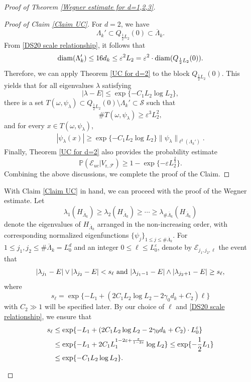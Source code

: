 \documentclass[11pt,reqno,UTF8,twoside]{amsart}
\newcommand{\barLambda}{\overline{\Lambda}}
\renewcommand{\P}{\mathbb{P}}
\newcommand{\mcE}{\mathcal{E}}
\newcommand{\mcF}{\mathcal{F}}
\newcommand{\mcS}{\mathcal{S}}
\newcommand{\diam}{{\rm diam}}
\theoremstyle{definition}
\numberwithin{equation}{section}
\begin{document}
\begin{proof}[Proof of Theorem \ref{Wegner estimate for d=1,2,3}]
\begin{proof}[Proof of Claim \ref{Claim UC}]
For $d=2$, we have%
\[\Lambda_k'\subset Q_{\frac12 L_2}(0) \subset \barLambda_k.\]
From  \eqref{DS20 scale relationship}, it follows that
\[\diam(\Lambda_k')\leq 16d_k \leq \varepsilon^2 L_2=\varepsilon^2 \cdot \diam(Q_{\frac{1}{2} L_2}(0)).\]
Therefore, we can  apply Theorem \ref{UC for d=2} to the block $Q_{\frac{1}{2} L_2}(0)$. This yields that for all eigenvalues $\lambda$ satisfying
\[|\lambda-E|\leq \exp\{-C_1 L_2\log L_2 \},\]
there is a set $T(\omega,\psi_{\lambda}) \subset Q_{\frac{1}{2}L_2}(0)\setminus \Lambda_k' \subset \mcS$ such that
\[\# T(\omega,\psi_\lambda) \geq \varepsilon^3 L_2^2,\]
and for every $x\in T(\omega,\psi_\lambda)$,
\begin{align*}
  |\psi_\lambda(x)| \geq  \exp\{-C_1 L_2\log L_2\} \|\psi_{\lambda}\|_{\ell^2(\Lambda_k')}.
\end{align*}
Finally, Theorem \ref{UC for d=2} also provides the probability estimate
\[\P(\mcE_{uc}|V_{\text{r},\mcF })\geq  1-\exp\{-\varepsilon L^{\frac{2}{3}}_2\}.\]
Combining the above discussions, we complete the proof of the Claim.
\end{proof}

With Claim \ref{Claim UC}  in hand, we can  proceed with the proof of the Wegner estimate. Let
\[\lambda_1(H_{\barLambda_k})\geq \lambda_2(H_{\barLambda_k})\geq \cdots \geq \lambda_{\# \barLambda_k} (H_{\barLambda_k})\]
denote the eigenvalues of $H_{\barLambda_k}$ arranged in the non-increasing order,  with  corresponding normalized eigenfunctions $\{\psi_j\}_{1\leq j \leq \# \barLambda_k}$.
For  $1\leq j_1, j_2 \leq \# \barLambda_k = L_0^d$ and an integer $0\leq \ell \leq L_0^{\varepsilon}$, denote by $\mcE_{j_1,j_2,\ell}$ the event that
\[|\lambda_{j_1}-E|\vee|\lambda_{j_2}-E|<s_{\ell} \ {\rm and} \ |\lambda_{j_1-1}-E|\wedge|\lambda_{j_2+1}-E|\geq s_{\ell},\]
where 
\[s_{\ell}=\exp\{-L_1+(2C_1L_2\log L_2 -2\gamma_0 d_{k}+C_2)\ell\}\]
with  $C_2\gg1$  will be specified  later.  By our choice of $\ell$ and \eqref{DS20 scale relationship}, we ensure  that 
\begin{align}\label{bound on s_l}
  s_{\ell}&\leq \exp\{-L_1+(2C_1L_2\log L_2 -2 \gamma_0 d_{k}+C_2)\cdot L_0^{\varepsilon}\} \\
 \notag    & \leq \exp\{-L_1 +2C_1 L_1^{1-2\varepsilon+\frac{\varepsilon}{1-2\varepsilon}}\log L_2 \}\leq \exp\{-\frac{1}{2}L_1\}\\
 \notag    &\leq \exp\{-C_1 L_2 \log L_2\}.
\end{align}


\begin{figure}[htbp]
  \centering



\end{figure}
\end{proof}
\end{document}

